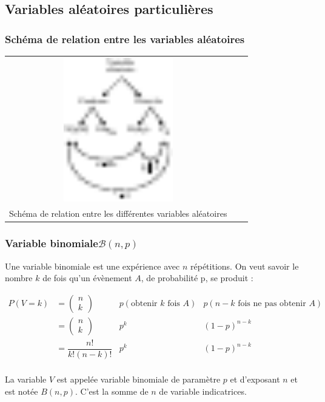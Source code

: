 \newpage
\subsection{Variables aléatoires particulières}

\subsubsection{Schéma de relation entre les variables aléatoires}
\begin{center}
	\begin{tabular}{ccc}
		\includegraphics[width=0.5\textwidth]{images/schema_relation_va.pdf}\\
		Schéma de relation entre les différentes variables aléatoires
	\end{tabular}
\end{center}


\newpage
\subsubsection{Variable binomiale$\mathcal{B}(n,p)$}
Une variable binomiale est une expérience avec $n$ répétitions. On veut savoir le nombre $k$ de fois qu'un évènement $A$, de probabilité p, se produit :

\begin{center}
$\begin{array}{llll}
P(V=k)&=\left(\begin{array}{c}n\\k\end{array}\right)&p(\text{obtenir $k$ fois $A$})&p(\text{$n-k$ fois ne pas obtenir $A$})\\
      &=\left(\begin{array}{c}n\\k\end{array}\right)&p^k&(1-p)^{n-k}\\[0.3cm]
      &=\dfrac{n!}{k!(n-k)!}&p^k&(1-p)^{n-k}\\
\end{array}$
\end{center}
La variable $V$ est appelée variable binomiale de paramètre $p$ et d'exposant $n$ et est notée $B(n,p)$. C'est la somme de $n$ de variable indicatrices.


